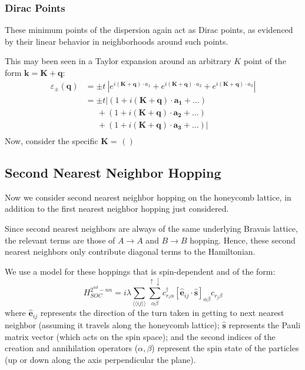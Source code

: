 \documentclass[10pt,a4paper]{article}\usepackage[]{graphicx}\usepackage[]{color}
\begin{document}
\begin{multicols}{2}
\subsubsection{Dirac Points}
These minimum points of the dispersion again act as Dirac points, as evidenced by their linear behavior in neighborhoods around such points.

This may been seen in a Taylor expansion around an arbitrary $K$ point of the form $\mathbf{k}=\mathbf{K}+\mathbf{q}$:
\begin{align*}
\varepsilon_{\pm}(\mathbf{q})&=\pm t\ |e^{i(\mathbf{K}+\mathbf{q})\cdot a_1}+e^{i(\mathbf{K}+\mathbf{q})\cdot a_2}+e^{i(\mathbf{K}+\mathbf{q})\cdot a_3}|\\
& = \pm t |(1+i(\mathbf{K}+\mathbf{q})\cdot \mathbf{a_1}+...)\\
&\quad\ \ +(1+i(\mathbf{K}+\mathbf{q})\cdot \mathbf{a_2}+...)\\
&\quad\ \ +(1+i(\mathbf{K}+\mathbf{q})\cdot \mathbf{a_3}+...)|\\
\end{align*}
Now, consider the specific $\mathbf{K}= \frac{}{}\left(\right)$


\subsection{Second Nearest Neighbor Hopping}
Now we consider second nearest neighbor hopping on the honeycomb lattice, in addition to the first nearest neighbor hopping just considered. 

Since second nearest neighbors are always of the same underlying Bravais lattice, the relevant terms are those of $A\rightarrow A$ and $B\rightarrow B$ hopping. Hence, these second nearest neighbors only contribute diagonal terms to the Hamiltonian. 

We use a model for these hoppings that is spin-dependent and of the form:
$$
H_{SOC}^{2^{nd}-nn} = i\lambda\sum_{\langle\langle ij \rangle\rangle} \sum_{\alpha\beta}^{\uparrow \downarrow} c^{\dagger}_{r_i \alpha}\left[ \hat{\mathbf{e}}_{ij}\cdot \hat{\mathbf{s}} \right]_{\alpha\beta}c_{r_j \beta}
$$ 
where $\hat{\mathbf{e}}_{ij}$ represents the direction of the turn taken in getting to next nearest neighbor (assuming it travels along the honeycomb lattice); $\hat{\mathbf{s}}$ represents the Pauli matrix vector (which acts on the spin space); and the second indices of the creation and annihilation operators ($\alpha,\beta$) represent the spin state of the particles (up or down along the axis perpendicular the plane).


\end{multicols}
\end{document}

